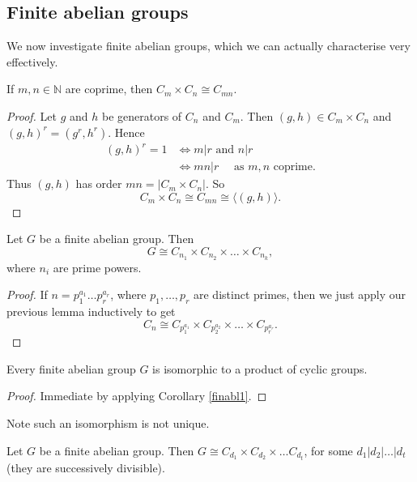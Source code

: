 \documentclass[egregdoesnotlikesansseriftitles,a4paper]{scrartcl}
\begin{document}
\subsection{Finite abelian groups}
We now investigate finite abelian groups, which we can actually characterise very effectively.
\begin{lemma}
      If $m,n \in \mathbb{N}$ are coprime, then $C_m \times C_n \cong C_{mn}$.
      \begin{proof}
            Let $g$ and $h$ be generators of $C_n$ and $C_m$. Then $(g,h)\in C_m \times C_n$ and $(g,h)^{r}=(g^{r}, h^{r})$. Hence 
            \begin{align*}
                 (g,h)^{r}=1 &\iff m|r \text{ and } n|r\\
                 & \iff mn|r \quad \text{ as } m,n \text{ coprime}.
            \end{align*}
            Thus $(g,h)$ has order $mn =|C_m \times C_n|$. So \[
            C_m \times C_n \cong C_{mn} \cong \langle (g,h) \rangle 
            .\]
      \end{proof}
\end{lemma}
\begin{corollary}\label{finabl1}
     Let $G$ be a finite abelian group. Then \[
     G \cong C_{n_1 } \times C_{n_2 }\times \ldots \times C_{n_k}
     ,\] where $n_{i}$ are prime powers. 
     \begin{proof}
            If $n=p_1^{a_1 }\ldots p_r ^{a_r}$, where $p_1 ,\ldots , p_r$ are distinct primes, then we just apply our previous lemma inductively to get \[
            C_{n}\cong C_{p_1 ^{a_1 }}\times C_{p_2 ^{a_2 }}\times \ldots \times C_{p_r ^{a_r }}
            .\] 
      \end{proof}
\end{corollary}
\begin{theorem}\label{finabl2}
     Every finite abelian group $G$ is isomorphic to a product of cyclic groups.
     \begin{proof}
            Immediate by applying Corollary \ref{finabl1}.
      \end{proof}
     \begin{remark}
            Note such an isomorphism is not unique.
     \end{remark}
\end{theorem}
\begin{theorem}\label{finabl3}
      Let $G$ be a finite abelian group. Then $G \cong C_{d_1 }\times C_{d_2 }\times \ldots C_{d_t}$, for some $d_1 | d_2 | \ldots | d_t$ (they are successively divisible).
\end{theorem}
\end{document}

